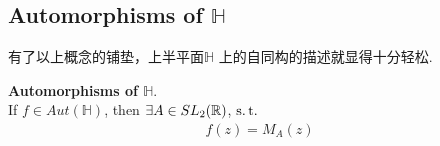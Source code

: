 \newpage
\subsection{Automorphisms of $\mathbb{H}$}
	有了以上概念的铺垫，上半平面$\mathbb{H}$ 上的自同构的描述就显得十分轻松.
	\begin{thm}\label{thm 14.1.1}
		\textbf{Automorphisms of $\mathbb{H}$}. \\
		If $f \in Aut(\mathbb{H})$, then $\exists A \in SL_2(\mathbb{R})$, $\operatorname{s.t.}$
		\begin{align}
			f(z) = M_{A}(z)
		\end{align}
	\end{thm}




	\ifx\allfiles\undefined

\fi